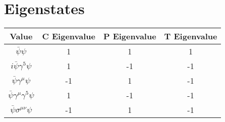 \documentclass{article}
\begin{document}
\section{Eigenstates}

\begin{tabular}{|c|c|c|c|}
\hline
Value & C Eigenvalue & P Eigenvalue & T Eigenvalue \\
\hline
$\bar\psi \psi$ & 1 & 1 & 1 \\
\hline
$i \bar\psi \gamma^5 \psi$ & 1 & -1 & -1 \\
\hline
$\bar\psi \gamma^\mu \psi$ & -1 & 1 & -1 \\
\hline
$\bar\psi \gamma^\mu \gamma^5 \psi$ & 1 & -1 &-1  \\
\hline
$\bar\psi \sigma^{\mu \nu} \psi$ & -1 & 1 & -1 \\
\hline
\end{tabular}
\end{document}
